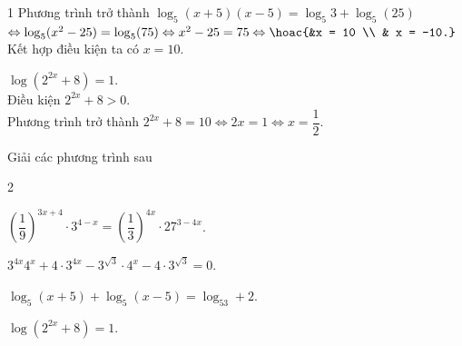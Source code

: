 \begin{bt}
{\begin{enumEX}{1}
	Phương trình trở thành $\log_5  (x+5)(x-5) = \log_5 3 + \log_5 (25)$ \\
	$\Leftrightarrow \log_5 (x^2 - 25)  = \log_5 (75) \Leftrightarrow x^2 - 25 = 75 \Leftrightarrow \hoac{&x = 10 \\ & x = -10.}$ \\
	 Kết hợp điều kiện ta có $x = 10$.
	\item $\log \left(2^{2x}+8\right) = 1$. \\ 
	Điều kiện $2^{2x} + 8 > 0$.  \\
	Phương trình trở thành $2^{2x} + 8 =  10 \Leftrightarrow 2x = 1 \Leftrightarrow x = \dfrac{1}{2}$.
	\end{enumEX}
 }
\end{bt}

\begin{ex}%
	Giải các  phương trình sau
	\begin{enumEX}{2}
		\item $\left(\dfrac{1}{9}\right)^{3x+4}  \cdot 3^{4-x}=\left(\dfrac{1}{3}\right)^{4x} \cdot 27^{3-4x}$.
		\item $3^{4x} 4^x+4\cdot 3^{4x}-3^{\sqrt{3}} \cdot 4^x-4\cdot 3^{\sqrt{3}}=0$. 
		 \item $\log _5(x+5)+\log _5(x-5)=\log _53+2$.
		\item $\log \left(2^{2x}+8\right)=1$. 
	\end{enumEX}
\end{ex}
